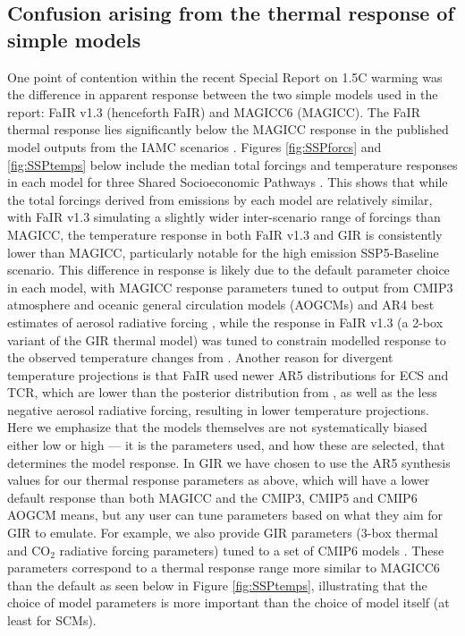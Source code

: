\documentclass[gmd, manuscript]{copernicus}
\begin{document}
\subsection*{Confusion arising from the thermal response of simple models}
One point of contention within the recent Special Report on 1.5\textdegree C warming \citep{IPCC2018} was the difference in apparent response between the two simple models used in the report: FaIR v1.3 (henceforth FaIR) and MAGICC6 (MAGICC). The FaIR thermal response lies significantly below the MAGICC response in the published model outputs from the IAMC scenarios \citep{Huppmann:2018:scenario-data}. Figures \ref{fig:SSPforcs} and \ref{fig:SSPtemps} below include the median total forcings and temperature responses in each model for three Shared Socioeconomic Pathways \citep{Riahi2017}. This shows that while the total forcings derived from emissions by each model are relatively similar, with FaIR v1.3 simulating a slightly wider inter-scenario range of forcings than MAGICC, the temperature response in both FaIR v1.3 and GIR is consistently lower than MAGICC, particularly notable for the high emission SSP5-Baseline scenario. This difference in response is likely due to the default parameter choice in each model, with MAGICC response parameters tuned to output from CMIP3 atmosphere and oceanic general circulation models (AOGCMs) and AR4 best estimates of aerosol radiative forcing  \citep{Meinshausen2011}, while the response in FaIR v1.3 (a 2-box variant of the GIR thermal model) was tuned to constrain modelled response to the observed temperature changes from \cite{Cowtan2014} \citep{Smith2017}. Another reason for divergent temperature projections is that FaIR used newer AR5 distributions for ECS and TCR, which are lower than the posterior distribution from \cite{Meinshausen2009}, as well as the  less negative aerosol radiative forcing, resulting in lower temperature projections. Here we emphasize that the models themselves are not systematically biased either low or high --- it is the parameters used, and how these are selected, that determines the model response. In GIR we have chosen to use the AR5 synthesis values for our thermal response parameters as above, which will have a lower default response than both MAGICC and the CMIP3, CMIP5 and CMIP6 AOGCM means, but any user can tune parameters based on what they aim for GIR to emulate. For example, we also provide GIR parameters (3-box thermal and CO$_2$ radiative forcing parameters) tuned to a set of CMIP6 models \citep{Tsutsui2019}. These parameters correspond to a thermal response range more similar to MAGICC6 than the default as seen below in Figure \ref{fig:SSPtemps}, illustrating that the choice of model parameters is more important than the choice of model itself (at least for SCMs).
\end{document}
